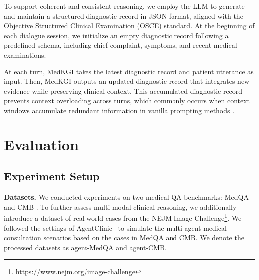 \documentclass[11pt]{article}
\newcommand{\tool}{MedKGI{\xspace}}
\begin{document}
To support coherent and consistent reasoning, we employ the LLM to generate and maintain a structured diagnostic record in JSON format, aligned with the Objective Structured Clinical Examination (OSCE) standard. 
At the beginning of each dialogue session, we initialize an empty diagnostic record following a predefined schema, including chief complaint, symptoms, and recent medical examinations.

At each turn, \tool{} takes the latest diagnostic record and patient utterance as input.
Then, \tool{} outputs an updated diagnostic record that integrates new evidence while preserving clinical context. This accumulated diagnostic record prevents context overloading across turns, which commonly occurs when context windows accumulate redundant information in vanilla prompting methods \cite{agentclinic2024samuel}.





\section{Evaluation}

\subsection{Experiment Setup}

\textbf{Datasets.}
We conducted experiments on two medical QA benchmarks: MedQA \cite{medqa2021jin} and CMB \cite{cmb2024wang, cmedbenchmark}.
To further assess multi-modal clinical reasoning, we additionally introduce a dataset of real-world cases from the NEJM Image Challenge\footnote{https://www.nejm.org/image-challenge}.
We followed the settings of AgentClinic~\cite{agentclinic2024samuel} to simulate the multi-agent medical consultation scenarios based on the cases in MedQA and CMB. We denote the processed datasets as agent-MedQA and agent-CMB.
\end{document}
